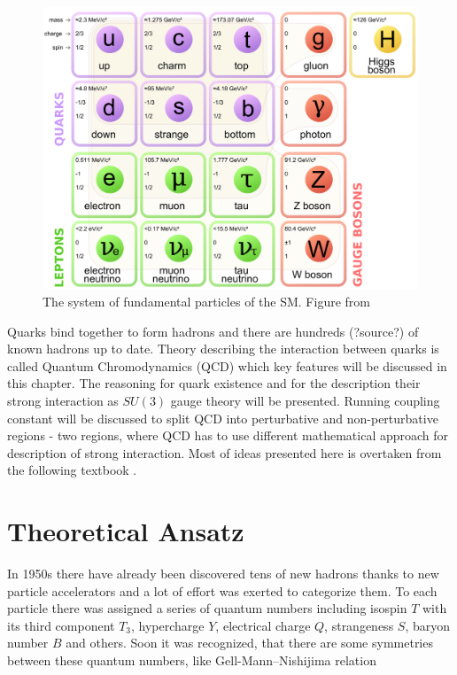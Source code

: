 \documentclass[a4paper,11pt]{report}
\begin{document}
\begin{figure}[!ht]
  \centering
  \includegraphics[width=\textwidth]{Chapter1/SM.png} 
  \caption{The system of fundamental particles of the SM. Figure from
    \cite{wiki:SMParticlesSource}}
  \label{fig:SMparticles}
\end{figure}

Quarks bind together to form hadrons and there are hundreds (?source?) of known
hadrons up to date. Theory describing the interaction between quarks is called
Quantum Chromodynamics (QCD) which key features will be discussed in this
chapter. The reasoning for quark existence and for the description their strong
interaction as $SU(3)$ gauge theory will be presented. Running coupling constant
will be discussed to split QCD into perturbative and non-perturbative regions -
two regions, where QCD has to use different mathematical approach for description of
strong interaction. Most of ideas presented here is overtaken from the following
textbook \cite{QCDTextbook}.

\section{Theoretical Ansatz}
\label{Sec:TheoreticalAnsatz}

In 1950s there have already been discovered tens of new hadrons thanks to new
particle accelerators and a lot of effort was exerted to categorize them. To each
particle there was assigned a series of quantum numbers
including isospin $T$ with its third component $T_3$, hypercharge $Y$,
electrical charge $Q$, strangeness $S$, baryon number $B$ and others. Soon it
was recognized, that there are some symmetries between these quantum numbers,
like Gell-Mann--Nishijima relation \cite{GellMannNishijima1,GellMannNishijima2}
\end{document}
